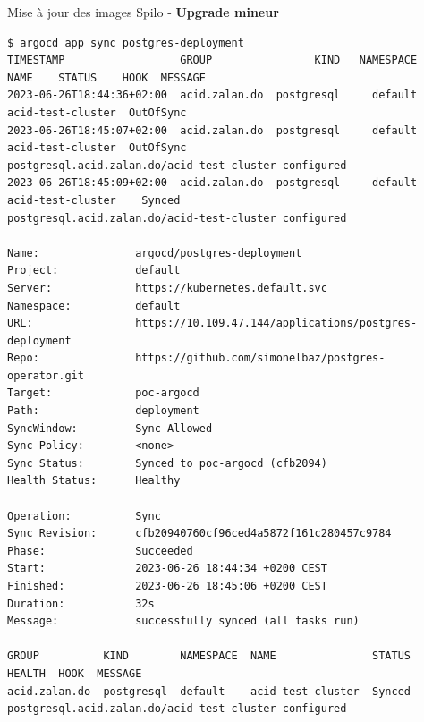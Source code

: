 \begin{frame}[fragile,shrink=4]{Mise à jour des images Spilo - \textbf{Upgrade mineur}}

   \begin{itemize}
\begin{tiny}
\begin{Verbatim}[commandchars=\\\{\}]
$ argocd app sync postgres-deployment
TIMESTAMP                  GROUP                KIND   NAMESPACE                  NAME    STATUS    HOOK  MESSAGE
2023-06-26T18:44:36+02:00  acid.zalan.do  postgresql     default     acid-test-cluster  OutOfSync
2023-06-26T18:45:07+02:00  acid.zalan.do  postgresql     default     acid-test-cluster  OutOfSync   
postgresql.acid.zalan.do/acid-test-cluster configured
2023-06-26T18:45:09+02:00  acid.zalan.do  postgresql     default     acid-test-cluster    Synced    
postgresql.acid.zalan.do/acid-test-cluster configured

Name:               argocd/postgres-deployment
Project:            default
Server:             https://kubernetes.default.svc
Namespace:          default
URL:                https://10.109.47.144/applications/postgres-deployment
Repo:               https://github.com/simonelbaz/postgres-operator.git
Target:             poc-argocd
Path:               deployment
SyncWindow:         Sync Allowed
Sync Policy:        <none>
Sync Status:        Synced to poc-argocd (cfb2094)
Health Status:      Healthy

Operation:          Sync
Sync Revision:      cfb20940760cf96ced4a5872f161c280457c9784
Phase:              Succeeded
Start:              2023-06-26 18:44:34 +0200 CEST
Finished:           2023-06-26 18:45:06 +0200 CEST
Duration:           32s
Message:            successfully synced (all tasks run)

GROUP          KIND        NAMESPACE  NAME               STATUS  HEALTH  HOOK  MESSAGE
acid.zalan.do  postgresql  default    acid-test-cluster  Synced                postgresql.acid.zalan.do/acid-test-cluster configured
\end{Verbatim}
\end{tiny}
   \end{itemize}

\end{frame}


